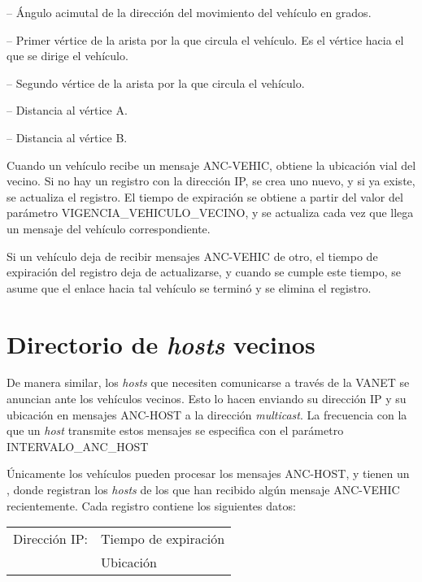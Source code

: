  -- Ángulo acimutal de la dirección del
movimiento del vehículo en grados.

 -- Primer vértice de la arista por la que
circula el vehículo. Es el vértice hacia el que se dirige el vehículo.

 -- Segundo vértice de la arista por la que
circula el vehículo.

 -- Distancia al vértice A.

 -- Distancia al vértice B.

\begin{sloppypar}
Cuando un vehículo recibe un mensaje ANC-VEHIC, obtiene la ubicación vial del
vecino. Si no hay un registro con la dirección IP, se crea uno nuevo, y si ya
existe, se actualiza el registro. El tiempo de expiración se obtiene a partir
del valor del parámetro VIGENCIA\_VEHICULO\_VECINO, y se actualiza cada vez que
llega un mensaje del vehículo correspondiente.
\end{sloppypar}

Si un vehículo deja de recibir mensajes ANC-VEHIC de otro, el tiempo de
expiración del registro deja de actualizarse, y cuando se cumple este tiempo,
se asume que el enlace hacia tal vehículo se terminó y se elimina el registro.

\section{Directorio de \textit{hosts} vecinos}

\label{sec:directorio_hosts_vecinos}

De manera similar, los \textit{hosts} que necesiten comunicarse a través de
la VANET se anuncian ante los vehículos vecinos. Esto lo hacen enviando su
dirección IP y su ubicación en mensajes ANC-HOST a la dirección
\textit{multicast}. La frecuencia con la que un \textit{host} transmite estos
mensajes se especifica con el parámetro INTERVALO\_ANC\_HOST

Únicamente los vehículos pueden procesar los mensajes ANC-HOST, y tienen un
, donde registran los \textit{hosts} de
los que han recibido algún mensaje ANC-VEHIC recientemente. Cada registro
contiene los siguientes datos:

\begin{center}
\begin{tabular}{ r l }
Dirección IP: & Tiempo de expiración \\
& Ubicación \\
\end{tabular}
\end{center}

